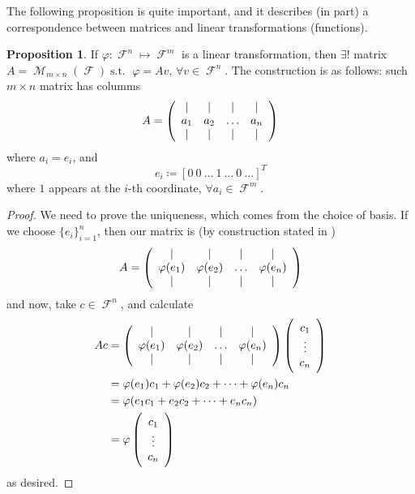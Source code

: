 \documentclass[11pt]{amsart} %
\theoremstyle{definition}
\newtheorem{proposition}[definition]{Proposition}
\theoremstyle{definition}
\DeclareMathOperator{\FF}{\mathcal{F}}
\DeclareMathOperator{\suchthat}{\text{ s.t. }}
\DeclareMathOperator{\Ma}{\mathcal{M}}
\numberwithin{equation}{section}
\begin{document}
The following proposition is quite important, and it describes (in part) a correspondence between matrices and linear transformations (functions).

\begin{proposition}
	\label{1-to-1LTandMatrix}
	If $\varphi : \FF^n \mapsto \FF^m$ is a linear transformation, then $\exists! $ matrix $A = \Ma_{m \times n} (\FF) \suchthat $ $\varphi = A v$, $\forall v \in \FF^n$. The construction is as follows: such $m \times n$ matrix has columms
	$$ A = \left( \begin{array}{c c c c}
	\mid & \mid & \mid & \mid \\
	a_1 & a_2 & \dots & a_n \\	
	\mid & \mid & \mid & \mid \\
	\end{array} \right) $$
	where $a_i = e_i$, and
	$$ e_i \coloneqq [ 0 \: 0 \: \dots \: 1 \: \dots \: 0 \: \dots ]^T $$
	where $1$ appears at the $i$-th coordinate, $\forall a_i \in \FF^m$.
\end{proposition}

\begin{proof}
	We need to prove the uniqueness, which comes from the choice of basis. If we choose $\{e_i\}_{i=1}^{n}$, then our matrix is (by construction stated in )
	$$ A= \left( \begin{array}{c c c c}
	\mid & \mid & \mid & \mid \\
	\varphi (e_1) & \varphi (e_2)  & \dots & \varphi (e_n)  \\	
	\mid & \mid & \mid & \mid \\
	\end{array} \right) $$
	and now, take $c \in \FF^n$, and calculate
	$$\begin{aligned}
	Ac &= \left( \begin{array}{c c c c}
	\mid & \mid & \mid & \mid \\
	\varphi (e_1) & \varphi (e_2)  & \dots & \varphi (e_n)  \\	
	\mid & \mid & \mid & \mid \\
	\end{array} \right) \left( \begin{array}{c } c_1 \\ \vdots \\ c_n \end{array} \right) \\
	&= \varphi (e_1) c_1 + \varphi (e_2) c_2 + \dots + \varphi (e_n) c_n \\
	&= \varphi (e_1 c_1 + e_2 c_2 + \dots + e_n c_n) \\
	&= \varphi \left( \begin{array}{c } c_1 \\ \vdots \\ c_n \end{array} \right) 
	\end{aligned}$$
	as desired.
\end{proof}
\end{document}
